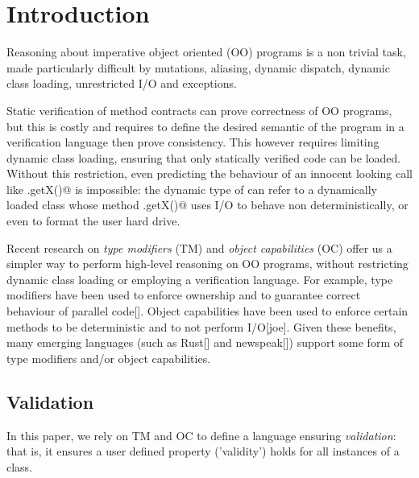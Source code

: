 
\section{Introduction}
\saveSpace\saveSpace
Reasoning about imperative object oriented (OO) programs is a non trivial task,
made particularly difficult by mutations, aliasing, dynamic dispatch, dynamic class loading,
unrestricted I/O and exceptions.

Static verification of method contracts can prove correctness of OO programs, but this is costly and requires to define the desired semantic of the program in a verification language then prove consistency.
This however requires limiting dynamic class loading, ensuring that only statically verified code can be loaded.
Without this restriction, even predicting the behaviour of an innocent looking call like 
\Q@myPoint.getX()@ is impossible: the dynamic type of \Q@myPoint@ can refer to a dynamically loaded class
whose method \Q@.getX()@ uses I/O to behave non deterministically, or even to format the user hard drive.

Recent research on \emph{type modifiers} (TM) and \emph{object capabilities} (OC) offer us a simpler way to perform high-level reasoning on OO programs, without restricting dynamic class loading or employing a verification language.
For example, type modifiers have been used to enforce ownership and to guarantee correct behaviour of parallel code[]. Object capabilities have been used to enforce certain methods to be deterministic and to not perform I/O[joe].
Given these benefits, many emerging languages (such as Rust[] and newspeak[])
support some form of type modifiers and/or object capabilities.

\loseSpace

\subsection{Validation}
In this paper, we rely on TM and OC to define a language ensuring \emph{validation}: that is, it ensures a user defined property ('validity') holds for all instances of a class.

